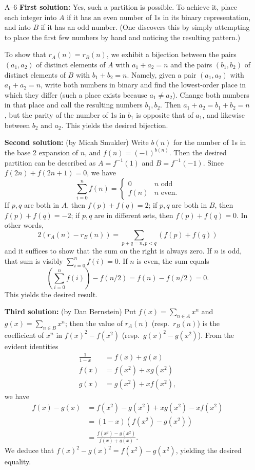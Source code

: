 \documentclass[amssymb,twocolumn,pra,10pt,aps]{revtex4-1}
\begin{document}
\begin{itemize}
\item[A--6]
\textbf{First solution:} Yes, such a partition is possible. To achieve it,
place each integer into $A$ if it has an even number of 1s in its binary
representation, and into $B$ if it has an odd number. (One discovers this
by simply attempting to place the first few numbers by hand and noticing
the resulting pattern.)

To show that $r_A(n) = r_B(n)$, we exhibit a bijection between the pairs
$(a_1, a_2)$ of distinct elements of $A$ with $a_1 + a_2 = n$ and the
pairs $(b_1, b_2)$ of distinct elements of $B$ with $b_1 + b_2 = n$.
Namely, given a pair $(a_1, a_2)$ with $a_1+a_2 = n$, write both numbers
in binary and find the lowest-order place in which they differ (such a
place exists because $a_1 \neq a_2$). Change both numbers in that place
and call the resulting numbers $b_1, b_2$. Then $a_1 + a_2 = b_1 + b_2 =
n$, but the parity of the number of 1s in $b_1$ is opposite that of $a_1$,
and likewise between $b_2$ and $a_2$. This yields the desired bijection.

\textbf{Second solution:} (by Micah Smukler)
Write $b(n)$ for the number of 1s in the base 2 expansion of $n$,
and $f(n) = (-1)^{b(n)}$.
Then
the desired partition can be described as $A = f^{-1}(1)$ and $B = f^{-1}(-1)$.
Since $f(2n) + f(2n+1) = 0$, we have
\[
\sum_{i=0}^n f(n) = \begin{cases} 0 & \mbox{$n$ odd} \\
f(n) & \mbox{$n$ even.} \end{cases}
\]
If $p,q$ are both in $A$, then $f(p) + f(q) = 2$;
if $p,q$ are both in $B$, then $f(p) + f(q) = -2$; if $p,q$ are
in different sets, then $f(p) + f(q) = 0$. In other words,
\[
2(r_A(n) - r_B(n)) = \sum_{p+q=n,p < q} (f(p) + f(q))
\]
and it suffices to show that the sum on the right is always zero.
If $n$ is odd, that sum is visibly $\sum_{i=0}^n f(i) = 0$.
If $n$ is even, the sum equals
\[
\left(\sum_{i=0}^n f(i) \right) - f(n/2) = f(n) - f(n/2) = 0.
\]
This yields the desired result.

\textbf{Third solution:} (by Dan Bernstein)
Put $f(x) = \sum_{n \in A} x^n$ and $g(x) = \sum_{n \in B} x^n$; then
the value of $r_A(n)$ (resp.\ $r_B(n)$) is the coefficient of $x^n$
in $f(x)^2 - f(x^2)$ (resp.\ $g(x)^2 - g(x^2)$). From the evident identities
\begin{align*}
\frac{1}{1-x} &= f(x) + g(x) \\
f(x) &= f(x^2) + xg(x^2) \\
g(x) &= g(x^2) + xf(x^2),
\end{align*}
we have
\begin{align*}
f(x) - g(x) &= f(x^2) - g(x^2) + xg(x^2) - xf(x^2) \\
&= (1-x)(f(x^2) - g(x^2)) \\
&= \frac{f(x^2) - g(x^2)}{f(x) + g(x)}.
\end{align*}
We deduce that $f(x)^2 - g(x)^2 = f(x^2) - g(x^2)$, yielding the desired
equality.


\end{itemize}
\end{document}
